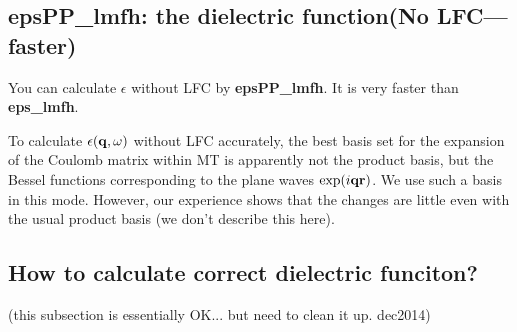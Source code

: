 \documentclass[a4paper,10pt,epsf,fleqn]{article}
\newcommand{\exe}[1]{{\bf #1}\index{#1}}
\begin{document}
\subsection{epsPP\_lmfh: the dielectric function(No LFC--- faster)}

You can calculate $\epsilon$ without LFC by
{\bf epsPP\_lmfh}. It is very faster than \exe{eps\_lmfh}.

To calculate $\epsilon({\bf q},\omega)$ without LFC accurately,
the best basis set for the expansion of the Coulomb matrix within MT
is apparently not the product basis, but the Bessel functions
corresponding to the plane waves $\exp(i{\bf q r})$.
We use such a basis in this mode. 
However, our experience shows that the changes are little even 
with the usual product basis (we don't describe this here).
%



\subsection{How to calculate correct dielectric funciton?}

(this subsection is essentially OK... but need to clean it up. dec2014)
\end{document}
